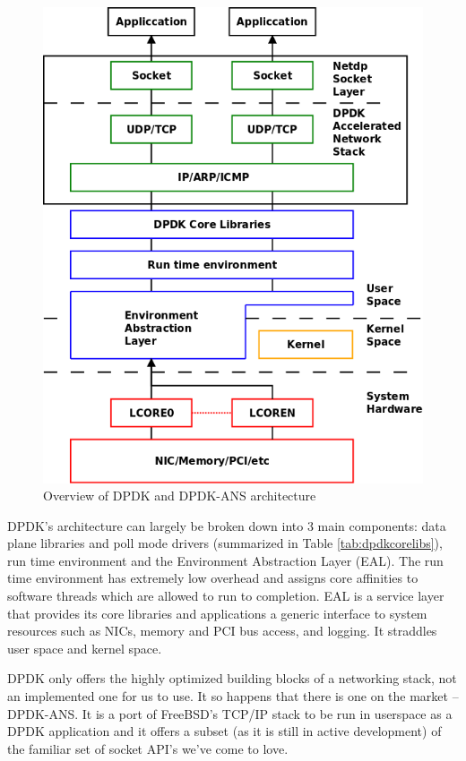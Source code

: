 \documentclass{sig-alternate-05-2015}
\begin{document}
\begin{figure}[]
\centering
\includegraphics[scale=0.3]{dpdk_archi.png}
\caption{Overview of DPDK and DPDK-ANS architecture}
\label{fig:dpdk-archi}
\end{figure} 

DPDK's architecture can largely be broken down into 3 main components: data plane libraries and poll mode drivers (summarized in Table \ref{tab:dpdkcorelibs}), run time environment and the Environment Abstraction Layer (EAL). The run time environment has extremely low overhead and assigns core affinities to software threads which are allowed to run to completion. EAL is a service layer that provides its core libraries and applications a generic interface to system resources such as NICs, memory and PCI bus access, and logging. It straddles user space and kernel space. \cite{dpdk:programmerguide} 

DPDK only offers the highly optimized building blocks of a networking stack, not an implemented one for us to use. It so happens that there is one on the market -- DPDK-ANS. It is a port of FreeBSD's TCP/IP stack to be run in userspace as a DPDK application and it offers a subset (as it is still in active development) of the familiar set of socket API's we've come to love.
\end{document}
